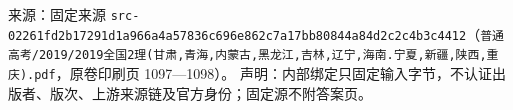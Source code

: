 
\begin{gktip}
来源：固定来源 \texttt{src-02261fd2b17291d1a966a4a57836c696e862c7a17bb80844a84d2c2c4b3c4412}（\texttt{普通高考/2019/2019全国2理(甘肃,青海,内蒙古,黑龙江,吉林,辽宁,海南.宁夏,新疆,陕西,重庆).pdf}，原卷印刷页 1097—1098）。
声明：内部绑定只固定输入字节，不认证出版者、版次、上游来源链及官方身份；固定源不附答案页。
\end{gktip}

\par\medskip



